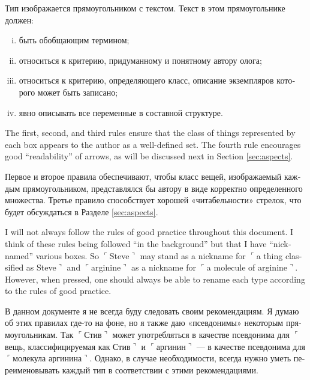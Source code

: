 \documentclass[a4paper]{book}
\def\tn{\textnormal}
\newcommand{\fakebox}[1]{\tn{$\ulcorner$#1$\urcorner$}}
\theoremstyle{myth}
\newtheorem{rulesRUS}[envRUS]{\begin{russian}Правила хорошего тона (рекомендации)\end{russian}}
\begin{document}
\begin{english}
\begin{rulesRUS}\label{rules:types}
\begin{russian} 
Тип изображается прямоугольником с текстом. Текст в этом прямоугольнике должен:
\begin{enumerate}[(i)]
\item быть обобщающим термином;
\item относиться к критерию, придуманному и понятному автору олога;
\item относиться к критерию, определяющего класс, описание экземпляров которого может быть записано;
\item явно описывать все переменные в составной структуре. 
\end{enumerate}
\end{russian}
\end{rulesRUS}

The first, second, and third rules ensure that the class of things represented by each box appears to the author as a well-defined set.  The fourth rule encourages good “readability” of arrows, as will be discussed next in Section \ref{sec:aspects}.  

\begin{russian}Первое и второе правила обеспечивают, чтобы класс вещей, изображаемый каждым прямоугольником, представлялся бы автору в виде корректно определенного множества.  Третье правило способствует хорошей «читабельности» стрелок, что будет обсуждаться в Разделе \ref{sec:aspects}.\end{russian}

I will not always follow the rules of good practice throughout this document.  I think of these rules being followed “in the background” but that I have “nicknamed” various boxes.  So \fakebox{Steve} may stand as a nickname for \fakebox{a thing classified as Steve} and \fakebox{arginine} as a nickname for \fakebox{a molecule of arginine}. However, when pressed, one should always be able to rename each type according to the rules of good practice.

\begin{russian}В данном документе я не всегда буду следовать своим рекомендациям. Я думаю об этих правилах где-то на фоне, но я также даю «псевдонимы» некоторым прямоугольникам.  Так \fakebox{Стив} может употребляться в качестве псевдонима для \fakebox{вещь, классифицируемая как Стив} и \fakebox{аргинин} — в качестве псевдонима для \fakebox{молекула аргинина}. Однако, в случае необходимости, всегда нужно уметь переименовывать каждый тип в соответствии с этими рекомендациями. \end{russian}


\end{english}
\end{document}
